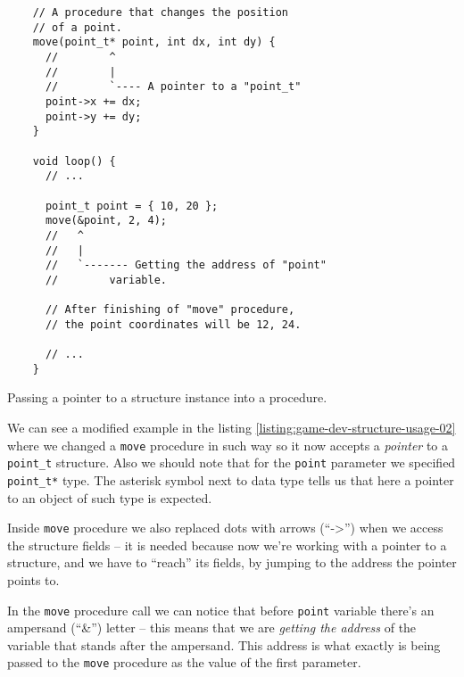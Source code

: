 \documentclass[../sparc.tex]{subfiles}
\begin{document}
\begin{listing}[H]
  \begin{verbatim}
    // A procedure that changes the position
    // of a point.
    move(point_t* point, int dx, int dy) {
      //        ^
      //        |
      //        `---- A pointer to a "point_t"
      point->x += dx;
      point->y += dy;
    }

    void loop() {
      // ...

      point_t point = { 10, 20 };
      move(&point, 2, 4);
      //   ^
      //   |
      //   `------- Getting the address of "point"
      //        variable.

      // After finishing of "move" procedure,
      // the point coordinates will be 12, 24.

      // ...
    }
  \end{verbatim}
  \caption{Passing a pointer to a structure instance into a procedure.}
  \label{listing:game-dev-structure-usage-02}
\end{listing}

We can see a modified example in the listing
\ref{listing:game-dev-structure-usage-02} where we changed a
\texttt{move} procedure in such way so it now accepts a \emph{pointer}
to a \texttt{point_t} structure.  Also we should note that for the
\texttt{point} parameter we specified \texttt{point_t*} type.
The asterisk symbol next to data type tells us that here a pointer to an object
of such type is expected.

Inside \texttt{move} procedure we also replaced dots with arrows
(``->'') when we access the structure fields -- it is needed because now we're
working with a pointer to a structure, and we have to ``reach'' its fields, by
jumping to the address the pointer points to.

In the \texttt{move} procedure call we can notice that before
\texttt{point} variable there's an ampersand (``\&'') letter -- this
means that we are \emph{getting the address} of the variable that stands after
the ampersand.  This address is what exactly is being passed to the
\texttt{move} procedure as the value of the first parameter.
\end{document}
